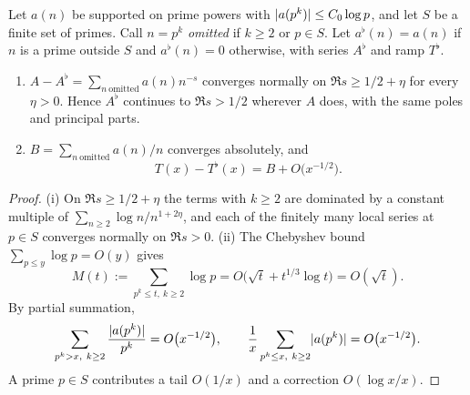 \begin{lemma}\label{ana:lem:powers}
Let $a(n)$ be supported on prime powers with $\lvert a(p^k)\rvert\le C_0\log p$, and let $S$ be a finite
set of primes. Call $n=p^k$ \emph{omitted} if $k\ge2$ or $p\in S$. Let $a^\flat(n)=a(n)$ if $n$
is a prime outside $S$ and $a^\flat(n)=0$ otherwise, with series $A^\flat$ and ramp $T^\flat$.
\begin{enumerate}[label=\textup{(\roman*)}]
\item $A-A^\flat=\sum_{n\ \mathrm{omitted}}a(n)n^{-s}$ converges normally on
 $\Re s\ge1/2+\eta$ for every $\eta>0$. Hence $A^\flat$ continues to $\Re s>1/2$ wherever $A$
 does, with the same poles and principal parts.
\item $B=\sum_{n\ \mathrm{omitted}}a(n)/n$ converges absolutely, and
 \begin{equation}\label{ana:eq:powers}
  T(x)-T^\flat(x)=B+O\bigl(x^{-1/2}\bigr).
 \end{equation}
\end{enumerate}
\end{lemma}

\begin{proof}
(i) On $\Re s\ge1/2+\eta$ the terms with $k\ge2$ are dominated by a constant multiple of
$\sum_{n\ge2}\log n/n^{1+2\eta}$, and each of the finitely many local series at $p\in S$
converges normally on $\Re s>0$. (ii) The Chebyshev bound $\sum_{p\le y}\log p=O(y)$ gives
\[
 M(t):=\sum_{p^k\le t,\ k\ge2}\log p=O\bigl(\sqrt t+t^{1/3}\log t\bigr)=O(\sqrt t).
\]
By partial summation,
\[
 \sum_{p^k>x,\ k\ge2}\frac{\abs{a(p^k)}}{p^k}=O\bigl(x^{-1/2}\bigr),\qquad
 \frac1x\sum_{p^k\le x,\ k\ge2}\abs{a(p^k)}=O\bigl(x^{-1/2}\bigr).
\]
A prime $p\in S$ contributes a tail $O(1/x)$ and a correction $O(\log x/x)$.
\end{proof}

